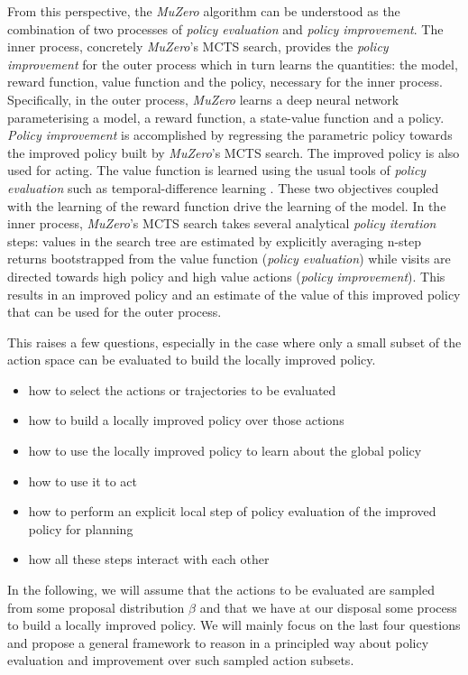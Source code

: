 \documentclass{article}
\newcommand{\muzero}{\emph{MuZero}}
\newcommand{\sample}{\beta}
\begin{document}
From this perspective, the \muzero{} algorithm can be understood as the combination of two processes of \emph{policy evaluation} and \emph{policy improvement}. The inner process, concretely \muzero{}'s MCTS search, provides the \emph{policy improvement} for the outer process which in turn learns the quantities: the model, reward function, value function and the policy, necessary for the inner process. Specifically, in the outer process, \muzero{} learns a deep neural network parameterising a model, a reward function, a state-value function and a policy. \emph{Policy improvement} is accomplished by regressing the parametric policy towards the improved policy built by \muzero{}'s MCTS search. The improved policy is also used for acting. The value function is learned using the usual tools of \emph{policy evaluation} such as temporal-difference learning \cite{sutton88}. These two objectives coupled with the learning of the reward function drive the learning of the model. In the inner process, \muzero{}'s MCTS search takes several analytical \emph{policy iteration} steps: values in the search tree are estimated by explicitly averaging n-step returns bootstrapped from the value function (\emph{policy evaluation}) while visits are directed towards high policy and high value actions (\emph{policy improvement}). This results in an improved policy and an estimate of the value of this improved policy that can be used for the outer process.

This raises a few questions, especially in the case where only a small subset of the action space can be evaluated to build  the locally improved policy.
\begin{itemize}[topsep=2pt,itemsep=2pt,parsep=0pt]
\item how to select the actions or trajectories to be evaluated
\item how to build a locally improved policy over those actions
\item how to use the locally improved policy to learn about the global policy
\item how to use it to act
\item how to perform an explicit local step of policy evaluation of the improved policy for planning
\item how all these steps interact with each other
\end{itemize}

In the following, we will assume that the actions to be evaluated are sampled from some proposal distribution $\sample$ and that we have at our disposal some process to build a locally improved policy. We will mainly focus on the last four questions and propose a general framework to reason in a principled way about policy evaluation and improvement over such sampled action subsets.
\end{document}
